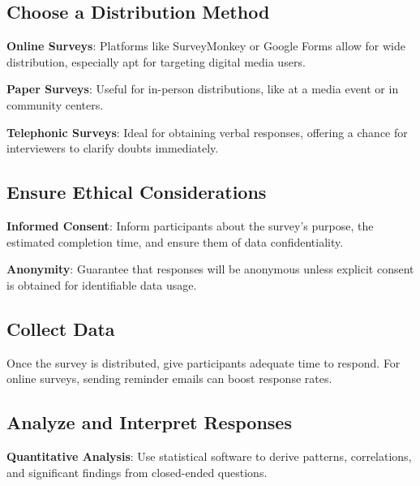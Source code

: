 \documentclass[
  b5paper]{book}
\begin{document}
\hypertarget{choose-a-distribution-method}{%
\subsection*{Choose a Distribution Method}\label{choose-a-distribution-method}}

\textbf{Online Surveys}: Platforms like SurveyMonkey or Google Forms allow for wide distribution, especially apt for targeting digital media users.

\textbf{Paper Surveys}: Useful for in-person distributions, like at a media event or in community centers.

\textbf{Telephonic Surveys}: Ideal for obtaining verbal responses, offering a chance for interviewers to clarify doubts immediately.

\hypertarget{ensure-ethical-considerations}{%
\subsection*{Ensure Ethical Considerations}\label{ensure-ethical-considerations}}

\textbf{Informed Consent}: Inform participants about the survey's purpose, the estimated completion time, and ensure them of data confidentiality.

\textbf{Anonymity}: Guarantee that responses will be anonymous unless explicit consent is obtained for identifiable data usage.

\hypertarget{collect-data}{%
\subsection*{Collect Data}\label{collect-data}}

Once the survey is distributed, give participants adequate time to respond.
For online surveys, sending reminder emails can boost response rates.

\hypertarget{analyze-and-interpret-responses}{%
\subsection*{Analyze and Interpret Responses}\label{analyze-and-interpret-responses}}

\textbf{Quantitative Analysis}: Use statistical software to derive patterns, correlations, and significant findings from closed-ended questions.
\end{document}
